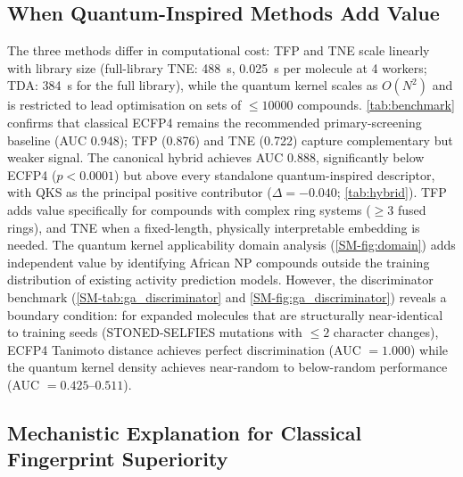 \documentclass[11pt,a4paper]{article}
\begin{document}
\subsection{When Quantum-Inspired Methods Add Value}

The three methods differ in computational cost: TFP and TNE scale linearly with library size (full-library TNE: \SI{488}{\second}, \SI{0.025}{\second} per molecule at 4 workers; TDA: \SI{384}{\second} for the full library), while the quantum kernel scales as $O(N^2)$ and is restricted to lead optimisation on sets of $\leq \num{10000}$ compounds. \cref{tab:benchmark} confirms that classical ECFP4 remains the recommended primary-screening baseline (AUC \num{0.948}); TFP (\num{0.876}) and TNE (\num{0.722}) capture complementary but weaker signal. The canonical hybrid achieves AUC \num{0.888}, significantly below ECFP4 ($p < \num{0.0001}$) but above every standalone quantum-inspired descriptor, with QKS as the principal positive contributor ($\Delta = -\num{0.040}$; \cref{tab:hybrid}). TFP adds value specifically for compounds with complex ring systems ($\geq 3$ fused rings), and TNE when a fixed-length, physically interpretable embedding is needed. The quantum kernel applicability domain analysis (\cref{SM-fig:domain}) adds independent value by identifying African NP compounds outside the training distribution of existing activity prediction models. However, the discriminator benchmark (\cref{SM-tab:ga_discriminator} and \cref{SM-fig:ga_discriminator}) reveals a boundary condition: for expanded molecules that are structurally near-identical to training seeds (STONED-SELFIES mutations with $\leq 2$ character changes), ECFP4 Tanimoto distance achieves perfect discrimination (AUC $= \num{1.000}$) while the quantum kernel density achieves near-random to below-random performance (AUC $= \numrange{0.425}{0.511}$).

\subsection{Mechanistic Explanation for Classical Fingerprint Superiority}
\end{document}
